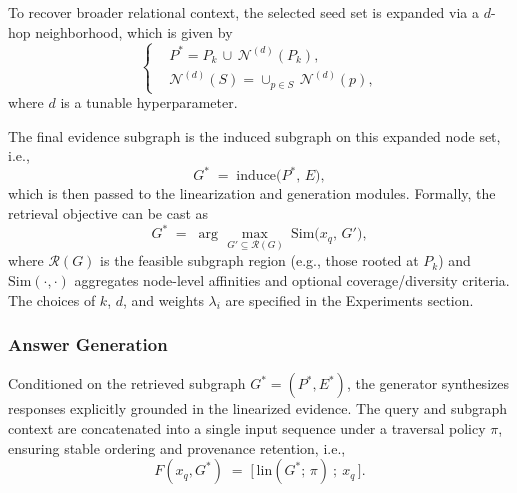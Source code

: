 \documentclass[journal]{IEEEtran}
\begin{document}
To recover broader relational context, the selected seed set is expanded via a $d$-hop neighborhood, which is given by
\begin{equation}
\left\{
\begin{aligned}
&P^{\ast} = P_k \,\cup\, \mathcal{N}^{(d)}(P_k), \\
&\mathcal{N}^{(d)}(S) = \cup_{p\in S}\,\mathcal{N}^{(d)}(p),
\end{aligned}
\right.
\label{eq:expansion}
\end{equation}
where $d$ is a tunable hyperparameter.

The final evidence subgraph is the induced subgraph on this expanded node set, i.e.,
\begin{equation}
G^{\ast} \;=\; \mathrm{induce}\!\bigl(P^{\ast},\,E\bigr),
\label{eq:induced}
\end{equation}
which is then passed to the linearization and generation modules. Formally, the retrieval objective can be cast as
\begin{equation}
G^{\ast}\;=\;\arg\max_{\,G' \subseteq \mathcal{R}(G)}\ 
\mathrm{Sim}\!\bigl(x_q,\,G'\bigr),
\label{eq:retrieval_obj}
\end{equation}
where $\mathcal{R}(G)$ is the feasible subgraph region (e.g., those rooted at $P_k$) and $\mathrm{Sim}(\cdot,\cdot)$ aggregates node-level affinities and optional coverage/diversity criteria. The choices of $k$, $d$, and weights $\lambda_i$ are specified in the Experiments section.

\subsubsection{Answer Generation}
\label{subsec:generation}

Conditioned on the retrieved subgraph $G^{\ast}=(P^{\ast},E^{\ast})$, the generator synthesizes responses explicitly grounded in the linearized evidence. The query and subgraph context are concatenated into a single input sequence under a traversal policy $\pi$, ensuring stable ordering and provenance retention, i.e.,
\begin{equation}
F(x_q, G^{\ast}) \;=\; \bigl[\, \mathrm{lin}(G^{\ast};\,\pi)\ ;\ x_q \,\bigr].
\label{eq:compose}
\end{equation}
\end{document}
